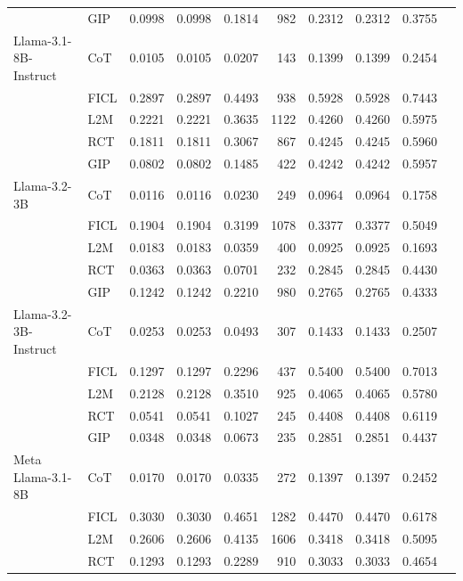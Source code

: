 \documentclass[conference]{IEEEtran}
\begin{document}
\begin{longtable}{p{3.5cm} l r r r r r r r r}
           & GIP  & 0.0998 & 0.0998 & 0.1814 & 982 & 0.2312 & 0.2312 & 0.3755 \\ \addlinespace
Llama-3.1-8B-Instruct & CoT  & 0.0105 & 0.0105 & 0.0207 & 143 & 0.1399 & 0.1399 & 0.2454 \\
                      & FICL & 0.2897 & 0.2897 & 0.4493 & 938 & 0.5928 & 0.5928 & 0.7443 \\
                      & L2M  & 0.2221 & 0.2221 & 0.3635 & 1122 & 0.4260 & 0.4260 & 0.5975 \\
                      & RCT  & 0.1811 & 0.1811 & 0.3067 & 867 & 0.4245 & 0.4245 & 0.5960 \\
                      & GIP  & 0.0802 & 0.0802 & 0.1485 & 422 & 0.4242 & 0.4242 & 0.5957 \\ \addlinespace
Llama-3.2-3B & CoT  & 0.0116 & 0.0116 & 0.0230 & 249 & 0.0964 & 0.0964 & 0.1758 \\
             & FICL & 0.1904 & 0.1904 & 0.3199 & 1078 & 0.3377 & 0.3377 & 0.5049 \\
             & L2M  & 0.0183 & 0.0183 & 0.0359 & 400 & 0.0925 & 0.0925 & 0.1693 \\
             & RCT  & 0.0363 & 0.0363 & 0.0701 & 232 & 0.2845 & 0.2845 & 0.4430 \\
             & GIP  & 0.1242 & 0.1242 & 0.2210 & 980 & 0.2765 & 0.2765 & 0.4333 \\ \addlinespace
Llama-3.2-3B-Instruct & CoT  & 0.0253 & 0.0253 & 0.0493 & 307 & 0.1433 & 0.1433 & 0.2507 \\
                      & FICL & 0.1297 & 0.1297 & 0.2296 & 437 & 0.5400 & 0.5400 & 0.7013 \\
                      & L2M  & 0.2128 & 0.2128 & 0.3510 & 925 & 0.4065 & 0.4065 & 0.5780 \\
                      & RCT  & 0.0541 & 0.0541 & 0.1027 & 245 & 0.4408 & 0.4408 & 0.6119 \\
                      & GIP  & 0.0348 & 0.0348 & 0.0673 & 235 & 0.2851 & 0.2851 & 0.4437 \\ \addlinespace
Meta Llama-3.1-8B & CoT  & 0.0170 & 0.0170 & 0.0335 & 272 & 0.1397 & 0.1397 & 0.2452 \\
                  & FICL & 0.3030 & 0.3030 & 0.4651 & 1282 & 0.4470 & 0.4470 & 0.6178 \\
                  & L2M  & 0.2606 & 0.2606 & 0.4135 & 1606 & 0.3418 & 0.3418 & 0.5095 \\
                  & RCT  & 0.1293 & 0.1293 & 0.2289 & 910 & 0.3033 & 0.3033 & 0.4654 \\

\end{longtable}
\end{document}

